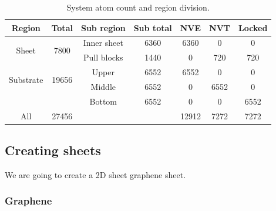 \begin{table}[H]
  \begin{center}
  \caption{System atom count and region division.}
  \label{tab:system_count}
  \begin{tabular}{ |c|| c | c | c | c | c | c |} \hline
    \textbf{Region} & \textbf{Total}  & Sub region & Sub total & \textbf{NVE} & \textbf{NVT} & \textbf{Locked} \\ \hline   
    \multirow{2}{*}{Sheet} & \multirow{2}{*}{7800} & Inner sheet & 6360 & 6360 & 0 & 0 \\ %
    & & Pull blocks & 1440 & 0 & 720 & 720 \\ \hline   
    \multirow{2}{*}{Substrate} & \multirow{2}{*}{19656} & Upper & 6552 & 6552 & 0 & 0 \\ %
    & & Middle & 6552 & 0 & 6552 & 0 \\ %
    & & Bottom & 6552 & 0 & 0 & 6552 \\ \hline \hline   
    All & 27456 & \multicolumn{2}{r|}{} & 12912 & 7272 & 7272 \\ \hline 
  \end{tabular}
  \end{center}
\end{table}



\subsection{Creating sheets}

We are going to create a 2D sheet graphene sheet. 

\subsubsection{Graphene}

